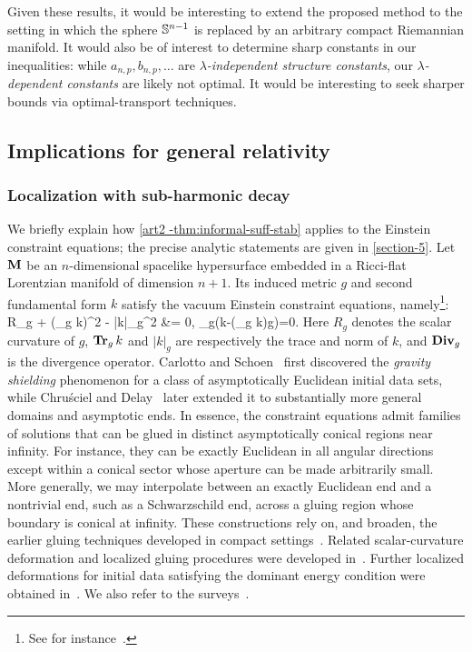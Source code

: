 \documentclass[11pt]{article}
\numberwithin{table}{section}
\numberwithin{equation}{section}
\numberwithin{table}{section}
\numberwithin{figure}{section}
\begin{document}
\eei

Given these results, it would be interesting to extend the proposed method to the setting in which the sphere $\mathbb S^{n-1}$ is replaced by an arbitrary compact Riemannian manifold. It would also be of interest to determine sharp constants in our inequalities: while $a_{n,p}, b_{n,p}, \ldots$ are \emph{$\lambda$-independent structure constants}, our \emph{$\lambda$-dependent constants} are likely not optimal. It would be interesting to seek sharper bounds via optimal-transport techniques. 
	

\subsection{Implications for general relativity} 
\label{sectionN1-4}

\subsubsection{Localization with sub-harmonic decay}

We briefly explain how \autoref{art2 -thm:informal-suff-stab} applies to the Einstein constraint equations; the precise analytic statements are given in \autoref{section-5}. Let $\mathbf M$ be an $n$-dimensional spacelike hypersurface embedded in a Ricci-flat Lorentzian manifold of dimension $n+1$. Its induced metric $g$ and second fundamental form $k$ satisfy the vacuum Einstein constraint equations, namely\footnote{See for instance~\cite[Chap.~VII]{Choquet-book}.}:
\aligned
R_g + (\Tr_g k)^2 - |k|_g^2 &= 0,
\qquad
\bfDiv_g\bigl(k-(\Tr_g k)g\bigr)=0.
\endaligned
\ee
Here $R_g$ denotes the scalar curvature of $g$, $\operatorname{\bf Tr}_g k$ and $|k|_g$ are respectively the trace and norm of $k$, and $\textnormal{\textbf{Div}}_g$ is the divergence operator. Carlotto and Schoen~\cite{CarlottoSchoen} first discovered the \emph{gravity shielding} phenomenon for a class of asymptotically Euclidean initial data sets, while Chru\'sciel and Delay~\cite{ChruscielDelay-2021} later extended it to substantially more general domains and asymptotic ends. 
%
In essence, the constraint equations admit families of solutions that can be glued in distinct asymptotically conical regions near infinity. For instance, they can be exactly Euclidean in all angular directions except within a conical sector whose aperture can be made arbitrarily small. More generally, we may interpolate between an exactly Euclidean end and a nontrivial end, such as a Schwarzschild end, across a gluing region whose boundary is conical at infinity. These constructions rely on, and broaden, the earlier gluing techniques developed in compact settings~\cite{ChruscielDelay-memoir,Corvino-2000,CorvinoSchoen}. Related scalar-curvature deformation and localized gluing procedures were developed in~\cite{CorvinoEM,Delay}. Further localized deformations for initial data satisfying the dominant energy condition were obtained in~\cite{CorvinoHuang}. We also refer to the surveys~\cite{Carlotto-Review,Chrusciel-bourbaki,GallowayMiaoSchoen}.
\end{document}
